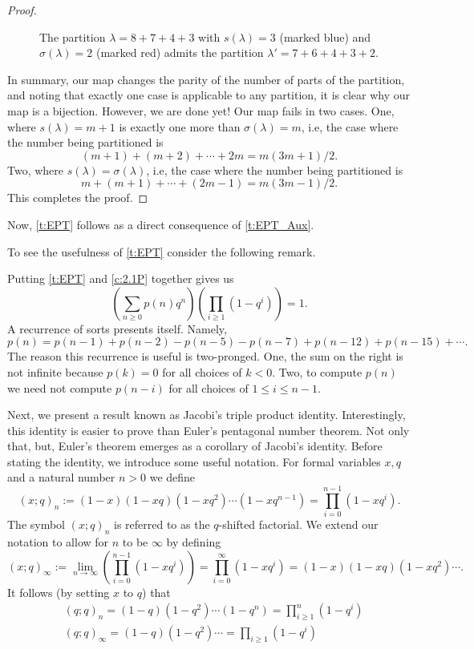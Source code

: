 \begin{proof}
\begin{figure}[H]
    \caption{The partition $\lambda=8+7+4+3$ with $s(\lambda)=3$ (marked blue) and $\sigma(\lambda)=2$ (marked red) admits the partition $\lambda'=7+6+4+3+2$.}
\end{figure}
In summary, our map changes the parity of the number of parts of the partition, and noting that exactly one case is applicable to any partition, it is clear why our map is a bijection. However, we are done yet! Our map fails in two cases. One, where $s(\lambda)=m+1$ is exactly one more than $\sigma(\lambda)=m$, i.e, the case where the number being partitioned is \[
(m+1)+(m+2)+\cdots+2m = m(3m+1)/2.
\]
Two, where $s(\lambda)=\sigma(\lambda)$, i.e, the case where the number being partitioned is \[
m+(m+1)+\cdots+(2m-1) = m(3m-1)/2.
\]
This completes the proof. 
\end{proof}
Now, \cref{t:EPT} follows as a direct consequence of \cref{t:EPT_Aux}. 
\par
To see the usefulness of \cref{t:EPT} consider the following remark.
\begin{remark}
Putting \cref{t:EPT} and \cref{c:2.1P} together gives us \[
\left(\sum_{n\geq 0}p(n)q^n\right)\left(\prod_{i\geq 1}(1-q^i)\right) = 1.
\] A recurrence of sorts presents itself. Namely,
\[
p(n) = p(n-1)+p(n-2)-p(n-5)-p(n-7)+p(n-12)+p(n-15)+\cdots. 
\] The reason this recurrence is useful is two-pronged. One, the sum on the right is not infinite because $p(k)=0$ for all choices of $k<0$. Two, to compute $p(n)$ we need not compute $p(n-i)$ for all choices of $1\leq i\leq n-1$.
\end{remark}
Next, we present a result known as Jacobi's triple product identity. Interestingly, this identity is easier to prove than Euler's pentagonal number theorem. Not only that, but, Euler's theorem emerges as a corollary of Jacobi's identity. Before stating the identity, we introduce some useful notation. For formal variables $x,q$ and a natural number $n>0$ we define
\[
(x;q)_n := (1-x)(1-xq)(1-xq^2)\cdots(1-xq^{n-1}) = \prod_{i=0}^{n-1}(1-xq^i).
\]
The symbol $(x;q)_n$ is referred to as the $q$-shifted factorial. We extend our notation to allow for $n$ to be $\infty$ by defining
\[
(x;q)_\infty := \lim_{n\to \infty}\left(\prod_{i=0}^{n-1}(1-xq^i)\right) = \prod_{i=0}^{\infty}(1-xq^i) = (1-x)(1-xq)(1-xq^2)\cdots.
\]
It follows (by setting $x$ to $q$) that
\begin{align*}
    &(q;q)_n = (1-q)(1-q^2)\cdots(1-q^n) = \prod_{i\geq 1}^n (1-q^i)\\
    &(q;q)_\infty = (1-q)(1-q^2)\cdots = \prod_{i\geq 1}(1-q^i)
\end{align*}
